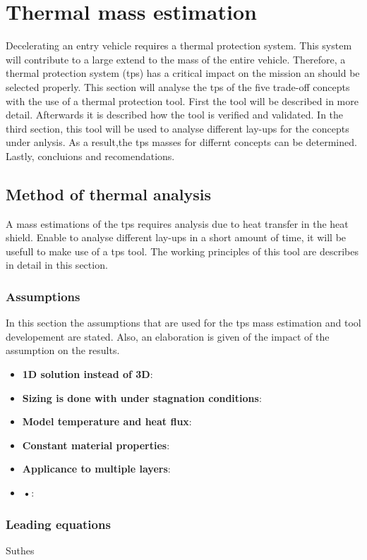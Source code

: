 \section{Thermal mass estimation}
\label{ch:thermtool}
Decelerating an entry vehicle requires a thermal protection system. This system will contribute to a large extend to the mass of the entire vehicle. Therefore, a thermal protection system (\gls{tps}) has a critical impact on the mission an should be selected properly. This section will analyse the \gls{tps} of the five trade-off concepts with the use of a thermal protection tool. First the tool will be described in more detail. Afterwards it is described how the tool is verified and validated. In the third section, this tool will be used to analyse different lay-ups for the concepts under anlysis. As a result,the \gls{tps} masses for differnt concepts can be determined. Lastly, concluions and recomendations.

\subsection{Method of thermal analysis}
A mass estimations of the \gls{tps} requires analysis due to heat transfer in the heat shield. Enable to analyse different lay-ups in a short amount of time, it will be usefull to make use of a \gls{tps} tool. The working principles of this tool are describes in detail in this section.

\subsubsection{Assumptions}
In this section the assumptions that are used for the \gls{tps} mass estimation and tool developement are stated. Also, an elaboration is given of the impact of the assumption on the results.

\begin{itemize}
\item \textbf{1D solution instead of 3D}: 
\item \textbf{Sizing is done with under stagnation conditions}: 
\item \textbf{Model temperature and heat flux}: 
\item \textbf{Constant material properties}:
\item \textbf{Applicance to multiple layers}:
\item \textbf{•}:
\end{itemize}

\subsubsection{Leading equations}
Suthes
